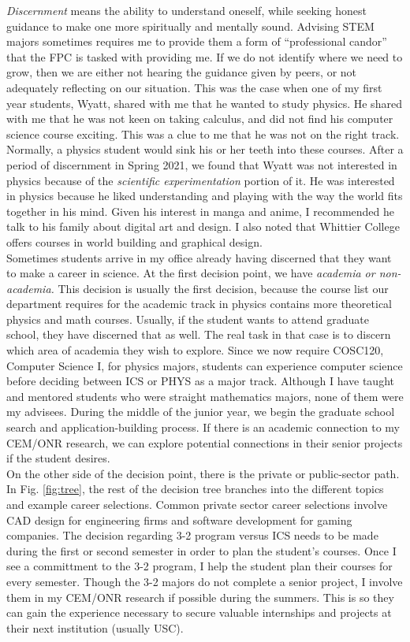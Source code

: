 \documentclass[../../../main.tex]{subfiles}
\begin{document}
\textit{Discernment} means the ability to understand oneself, while seeking honest guidance to make one more spiritually and mentally sound.  Advising STEM majors sometimes requires me to provide them a form of ``professional candor'' that the FPC is tasked with providing me.  If we do not identify where we need to grow, then we are either not hearing the guidance given by peers, or not adequately reflecting on our situation.  This was the case when one of my first year students, Wyatt, shared with me that he wanted to study physics.  He shared with me that he was not keen on taking calculus, and did not find his computer science course exciting.  This was a clue to me that he was not on the right track.  Normally, a physics student would sink his or her teeth into these courses.  After a period of discernment in Spring 2021, we found that Wyatt was not interested in physics because of the \textit{scientific experimentation} portion of it.  He was interested in physics because he liked understanding and playing with the way the world fits together in his mind.  Given his interest in manga and anime, I recommended he talk to his family about digital art and design.  I also noted that Whittier College offers courses in world building and graphical design.
\\
\vspace{0.25cm}
Sometimes students arrive in my office already having discerned that they want to make a career in science.  At the first decision point, we have \textit{academia or non-academia.}  This decision is usually the first decision, because the course list our department requires for the academic track in physics contains more theoretical physics and math courses.  Usually, if the student wants to attend graduate school, they have discerned that as well.  The real task in that case is to discern which area of academia they wish to explore.  Since we now require COSC120, Computer Science I, for physics majors, students can experience computer science before deciding between ICS or PHYS as a major track.  Although I have taught and mentored students who were straight mathematics majors, none of them were my advisees.  During the middle of the junior year, we begin the graduate school search and application-building process.  If there is an academic connection to my CEM/ONR research, we can explore potential connections in their senior projects if the student desires.
\\
\vspace{0.25cm}
On the other side of the decision point, there is the private or public-sector path.  In Fig. \ref{fig:tree}, the rest of the decision tree branches into the different topics and example career selections.  Common private sector career selections involve CAD design for engineering firms and software development for gaming companies.  The decision regarding 3-2 program versus ICS needs to be made during the first or second semester in order to plan the student's courses.  Once I see a committment to the 3-2 program, I help the student plan their courses for every semester.  Though the 3-2 majors do not complete a senior project, I involve them in my CEM/ONR research if possible during the summers.  This is so they can gain the experience necessary to secure valuable internships and projects at their next institution (usually USC).
\end{document}
